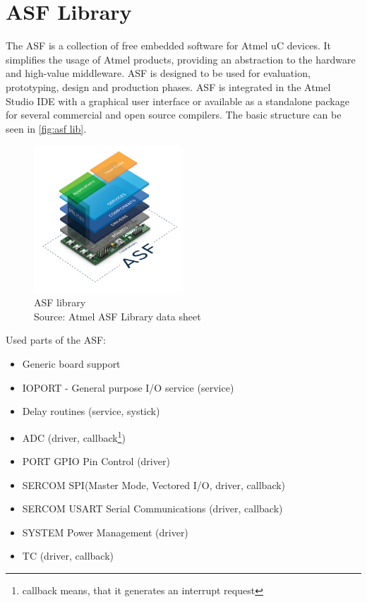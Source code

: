 \documentclass[a4paper,12pt]{scrreprt}
\begin{document}
\section{\acs{ASF} Library}
The \acs{ASF} is a collection of free embedded software for Atmel \acs{uC} devices. It simplifies the usage of Atmel products, providing an abstraction to the hardware and high-value middleware. \acs{ASF} is designed to be used for evaluation, prototyping, design and production phases. \acs{ASF} is integrated in the Atmel Studio IDE with a graphical user interface or available as a standalone package for several commercial and open source compilers. The basic structure can be seen in \autoref{fig:asf lib}.

\begin{figure}[H]
  \centering
   \includegraphics[width=0.5\textwidth]{pictures/ASF}
   \caption[ASF library]{ASF library\\
	Source: Atmel \acs{ASF} Library data sheet 
   }
   \label{fig:asf lib}
\end{figure} 

Used parts of the \acs{ASF}:

\begin{itemize}
\item Generic board support
\item IOPORT - General purpose \acs{I/O} service (service)
\item Delay routines (service, systick)
\item \acs{ADC} (driver, callback\footnote{callback means, that it generates an interrupt request})
\item PORT GPIO Pin Control (driver)
\item SERCOM \acs{SPI}(Master Mode, Vectored \acs{I/O}, driver, callback)
\item SERCOM USART Serial Communications (driver, callback)
\item SYSTEM Power Management (driver)
\item \acs{TC} (driver, callback)
\end{itemize}
\end{document}
